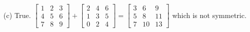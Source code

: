\documentclass{article}
\begin{document}
\begin{enumerate}
\begin{itemize}
			\item[(c)]
				True.
				$\begin{bmatrix}
					1 & 2 & 3 \\
					4 & 5 & 6 \\
					7 & 8 & 9
				\end{bmatrix}+\begin{bmatrix}
					2 & 4 & 6 \\
					1 & 3 & 5 \\
					0 & 2 & 4
				\end{bmatrix}=\begin{bmatrix}
					3 & 6 & 9 \\
					5 & 8 & 11 \\
					7 & 10 & 13
				\end{bmatrix}$ 
				which is not symmetric.
		\end{itemize}
	
\end{enumerate}
\end{document}
